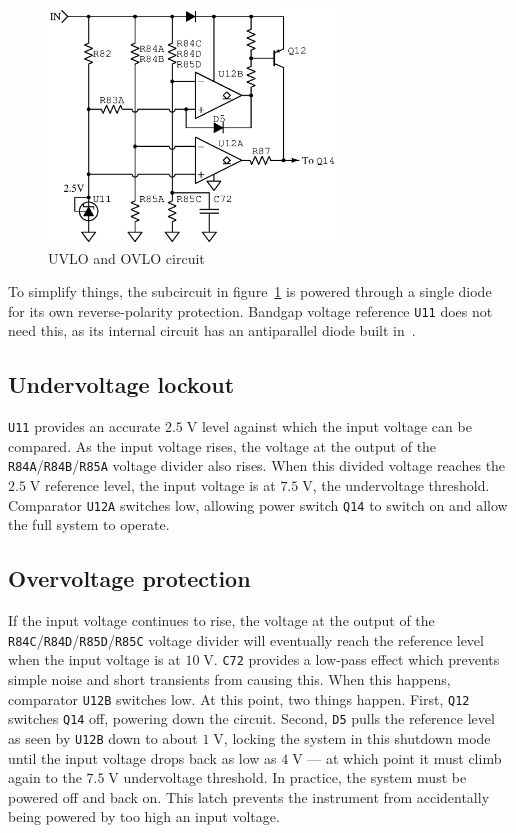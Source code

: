 \documentclass[article,oneside]{memoir}
\newcommand{\refdes}[1]{\texttt{#1}}
\newcommand{\mr}[1]{\ensuremath{\mathrm{#1}}}
\begin{document}
\begin{multicols}{2}
\begin{figure}[H]
\centering
\includegraphics[width=3in]{comparator}
\caption{UVLO and OVLO circuit}
\label{fig:uovlo}
\end{figure}

To simplify things, the subcircuit in figure~\ref{fig:uovlo} is powered through
a single diode for its own reverse-polarity protection. Bandgap voltage reference
\refdes{U11} does not need this, as its internal circuit has an antiparallel diode
built in~\cite{tl431}.

\subsection{Undervoltage lockout}

\refdes{U11} provides an accurate $2.5\;\mr{V}$ level against which the input
voltage can be compared. As the input voltage rises, the voltage at the output of
the \refdes{R84A}/\refdes{R84B}/\refdes{R85A} voltage divider also rises. When
this divided voltage reaches the $2.5\;\mr{V}$ reference level, the input voltage
is at $7.5\;\mr{V}$, the undervoltage threshold. Comparator \refdes{U12A}
switches low, allowing power switch \refdes{Q14} to switch on and allow the
full system to operate.

\subsection{Overvoltage protection}

If the input voltage continues to rise, the voltage at the output of the
\refdes{R84C}/\refdes{R84D}/\refdes{R85D}/\refdes{R85C} voltage divider will
eventually reach the reference level when the input voltage is at $10\;\mr{V}$.
\refdes{C72} provides a low-pass effect which prevents simple noise and short
transients from causing this. When this happens, comparator \refdes{U12B}
switches low. At this point, two things happen. First, \refdes{Q12} switches
\refdes{Q14} off, powering down the circuit. Second, \refdes{D5} pulls the
reference level as seen by \refdes{U12B} down to about $1\;\mr{V}$, locking
the system in this shutdown mode until the input voltage drops back as low
as $4\;\mr{V}$ --- at which point it must climb again to the $7.5\;\mr{V}$
undervoltage threshold. In practice, the system must be powered off and back
on. This latch prevents the instrument from accidentally being powered by
too high an input voltage.


\end{multicols}
\end{document}
